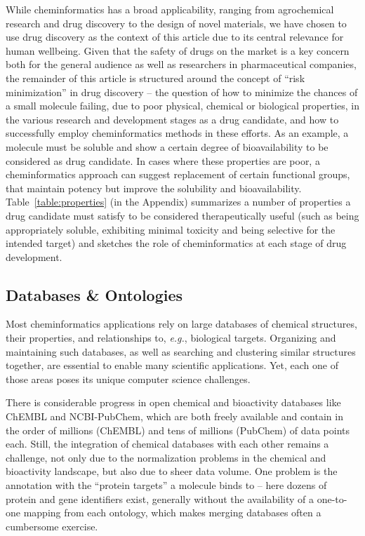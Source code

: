 \documentclass{sig-alternate}
\begin{document}
While cheminformatics has a broad applicability, ranging from
agrochemical research and drug discovery to the design of novel
materials, we have chosen to use drug discovery as the context of this
article due to its central relevance for human wellbeing. Given that
the safety of drugs on the market is a key concern both for the
general audience as well as researchers in pharmaceutical companies,
the remainder of this article is structured around the concept of
``risk minimization'' in drug discovery -- the question of how to
minimize the chances of a small molecule failing, due to poor
physical, chemical or biological properties, in the various research
and development stages as a drug candidate, and how to successfully
employ cheminformatics methods in these efforts. As an example, a
molecule must be soluble and show a certain degree of bioavailability
to be considered as drug candidate. In cases where these properties
are poor, a cheminformatics approach can suggest replacement of
certain functional groups, that maintain potency but improve the
solubility and bioavailability.  Table~\ref{table:properties} (in the
Appendix) summarizes a number of properties a drug candidate must
satisfy to be considered therapeutically useful (such as being
appropriately soluble, exhibiting minimal toxicity and being selective
for the intended target) and sketches the role of cheminformatics at
each stage of drug development.
%
\subsection{Databases \& Ontologies}
\label{sec:databases}
%
Most cheminformatics applications rely on large databases of chemical structures,
their properties, and relationships to, \textit{e.g.}, biological targets.
Organizing and maintaining such databases, as well as searching and clustering similar structures together,
are essential  to enable many scientific applications. Yet, each one of
those areas poses its unique computer science challenges.

There is considerable progress in open chemical and bioactivity databases like
ChEMBL and NCBI-PubChem, which are both freely available and contain in the order of millions (ChEMBL) and tens of
millions (PubChem) of data points each. Still, the integration
of chemical databases with each other remains a challenge, not only due to the
normalization problems in the chemical and bioactivity landscape, but also due
to sheer data volume. One problem is the annotation with the ``protein targets'' a molecule binds to -- here dozens of
protein and gene identifiers exist, generally without the availability of a one-to-one mapping from each ontology, which makes merging databases often a cumbersome exercise.
\end{document}
